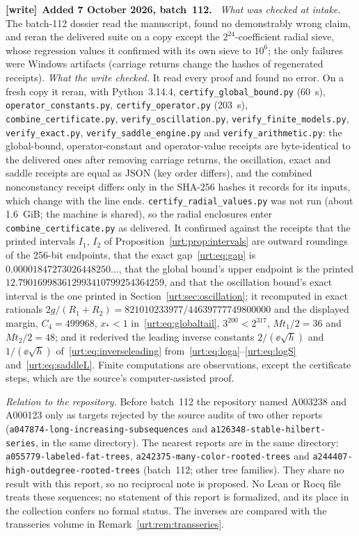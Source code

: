 \documentclass[11pt,letterpaper]{article}
\theoremstyle{remark}\newtheorem{remark}[theorem]{Remark}
\newcommand{\file}[1]{\nolinkurl{#1}}
\newenvironment{writenote}[1][]{\par\smallskip\begingroup\small
 \noindent\textbf{[write]}\if\relax\detokenize{#1}\relax\else~\textbf{#1.}\fi\ }%
 {\par\endgroup\smallskip}
\begin{document}
\begin{writenote}[Added 7 October 2026, batch~112]
\emph{What was checked at intake.} The batch-112 dossier read the
manuscript, found no demonstrably wrong claim, and reran the delivered suite
on a copy except the $2^{24}$-coefficient radial sieve, whose regression
values it confirmed with its own sieve to $10^6$; the only failures were
Windows artifacts (carriage returns change the hashes of regenerated
receipts). \emph{What the write checked.} It read every proof and found no
error. On a fresh copy it reran, with Python~3.14.4,
\file{certify_global_bound.py} (60~s), \file{operator_constants.py},
\file{certify_operator.py} (203~s), \file{combine_certificate.py},
\file{verify_oscillation.py}, \file{verify_finite_models.py},
\file{verify_exact.py}, \file{verify_saddle_engine.py} and
\file{verify_arithmetic.py}: the global-bound, operator-constant and
operator-value receipts are byte-identical to the delivered ones after
removing carriage returns, the oscillation, exact and saddle receipts are
equal as JSON (key order differs), and the combined nonconstancy receipt
differs only in the SHA-256 hashes it records for its inputs, which change
with the line ends. \file{certify_radial_values.py} was not run (about
1.6~GiB; the machine is shared), so the radial enclosures enter
\file{combine_certificate.py} as delivered. It confirmed against the receipts
that the printed intervals $I_1$, $I_2$ of
Proposition~\ref{urt:prop:intervals} are outward roundings of the 256-bit
endpoints, that the exact gap~\eqref{urt:eq:gap} is
$0.00001847273026448250\ldots$, that the global bound's upper endpoint is the
printed $12.790169983612993410799254364259$, and that the oscillation bound's
exact interval is the one printed in Section~\ref{urt:sec:oscillation}; it
recomputed in exact rationals $2g/(R_1+R_2)=821010233977/44639777749800000$
and the displayed margin, $C_4=499968$, $x_*<1$ in~\eqref{urt:eq:globaltail},
$3^{200}<2^{317}$, $Mt_1/2=36$ and $Mt_2/2=48$; and it rederived the
leading inverse constants $2/(\ee\sqrt h)$ and $1/(\ee\sqrt h)$
of~\eqref{urt:eq:inverseleading} from~\eqref{urt:eq:loga}--\eqref{urt:eq:logS}
and~\eqref{urt:eq:saddleL}. Finite computations are observations, except the
certificate steps, which are the source's computer-assisted proof.

\emph{Relation to the repository.} Before batch~112 the repository named
A003238 and A000123 only as targets rejected by the source audits of two
other reports (\file{a047874-long-increasing-subsequences} and
\file{a126348-stable-hilbert-series}, in the same directory). The
nearest reports are in the same directory: \file{a055779-labeled-fat-trees},
\file{a242375-many-color-rooted-trees} and
\file{a244407-high-outdegree-rooted-trees} (batch~112; other tree
families). They share no result with this report, so no reciprocal note is
proposed. No Lean or Rocq file treats these sequences; no statement of this
report is formalized, and its place in the collection confers no formal
status. The inverses are compared with the transseries volume in
Remark~\ref{urt:rem:transseries}.
\end{writenote}
\end{document}

